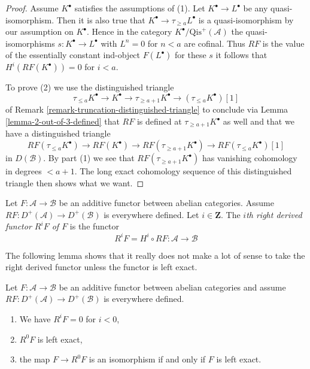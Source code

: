 \begin{proof}
Assume $K^\bullet$ satisfies the assumptions of (1).
Let $K^\bullet \to L^\bullet$ be any quasi-isomorphism.
Then it is also true that $K^\bullet \to \tau_{\geq a}L^\bullet$
is a quasi-isomorphism by our assumption on $K^\bullet$.
Hence in the category $K^\bullet/\text{Qis}^{+}(\mathcal{A})$ the
quasi-isomorphisms $s : K^\bullet \to L^\bullet$ with $L^n = 0$ for $n < a$
are cofinal. Thus $RF$ is the value of the essentially constant
ind-object $F(L^\bullet)$ for these $s$ it follows that
$H^i(RF(K^\bullet)) = 0$ for $i < a$.

\medskip\noindent
To prove (2) we use the distinguished triangle
$$
\tau_{\leq a}K^\bullet \to K^\bullet \to \tau_{\geq a + 1}K^\bullet
\to (\tau_{\leq a}K^\bullet)[1]
$$
of Remark \ref{remark-truncation-distinguished-triangle} to conclude
via Lemma \ref{lemma-2-out-of-3-defined} that
$RF$ is defined at $\tau_{\geq a + 1}K^\bullet$ as well and that we have
a distinguished triangle
$$
RF(\tau_{\leq a}K^\bullet) \to RF(K^\bullet) \to RF(\tau_{\geq a + 1}K^\bullet)
\to RF(\tau_{\leq a}K^\bullet)[1]
$$
in $D(\mathcal{B})$. By part (1) we see that $RF(\tau_{\geq a + 1}K^\bullet)$
has vanishing cohomology in degrees $< a + 1$. The long exact cohomology
sequence of this distinguished triangle then shows what we want.
\end{proof}

\begin{definition}
\label{definition-higher-derived-functors}
Let $F : \mathcal{A} \to \mathcal{B}$ be an additive functor
between abelian categories. Assume
$RF : D^{+}(\mathcal{A}) \to D^{+}(\mathcal{B})$ is everywhere
defined. Let $i \in \mathbf{Z}$.
The {\it $i$th right derived functor $R^iF$ of $F$} is the functor
$$
R^iF = H^i \circ RF :
\mathcal{A}
\longrightarrow
\mathcal{B}
$$
\end{definition}

\noindent
The following lemma shows that it really does not make a lot
of sense to take the right derived functor unless the functor
is left exact.

\begin{lemma}
\label{lemma-left-exact-higher-derived}
Let $F : \mathcal{A} \to \mathcal{B}$ be an additive functor
between abelian categories and assume
$RF : D^{+}(\mathcal{A}) \to D^{+}(\mathcal{B})$ is everywhere
defined.
\begin{enumerate}
\item We have $R^iF = 0$ for $i < 0$,
\item $R^0F$ is left exact,
\item the map $F \to R^0F$ is an isomorphism if and
only if $F$ is left exact.
\end{enumerate}
\end{lemma}

